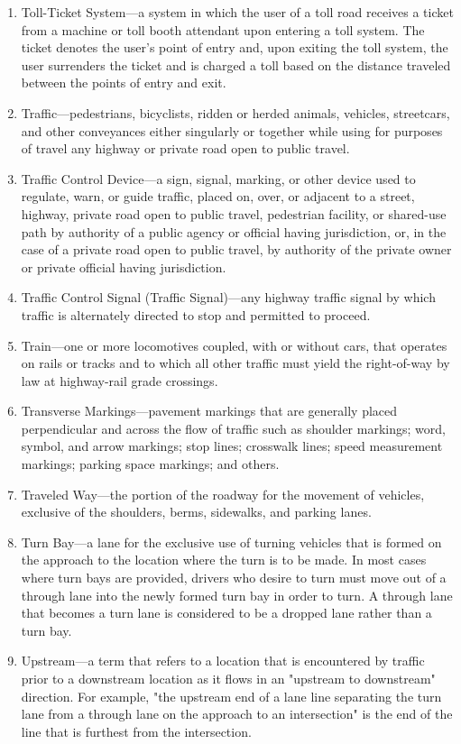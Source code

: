 \documentclass[9pt]{memoir}
\begin{document}
{\begin{enumerate}[label=\arabic*., ref=\arabic*]
\item Toll-Ticket System---a system in which the user of a toll road receives a ticket from a machine or toll booth attendant upon entering a toll system. The ticket denotes the user's point of entry and, upon exiting the toll system, the user surrenders the ticket and is charged a toll based on the distance traveled between the points of entry and exit.
\item Traffic---pedestrians, bicyclists, ridden or herded animals, vehicles, streetcars, and other conveyances either singularly or together while using for purposes of travel any highway or private road open to public travel.
\item Traffic Control Device---a sign, signal, marking, or other device used to regulate, warn, or guide traffic, placed on, over, or adjacent to a street, highway, private road open to public travel, pedestrian facility, or shared-use path by authority of a public agency or official having jurisdiction, or, in the case of a private road open to public travel, by authority of the private owner or private official having jurisdiction.
\item Traffic Control Signal (Traffic Signal)---any highway traffic signal by which traffic is alternately directed to stop and permitted to proceed.
\item Train---one or more locomotives coupled, with or without cars, that operates on rails or tracks and to which all other traffic must yield the right-of-way by law at highway-rail grade crossings.
\item Transverse Markings---pavement markings that are generally placed perpendicular and across the flow of traffic such as shoulder markings; word, symbol, and arrow markings; stop lines; crosswalk lines; speed measurement markings; parking space markings; and others.
\item Traveled Way---the portion of the roadway for the movement of vehicles, exclusive of the shoulders, berms, sidewalks, and parking lanes.
\item Turn Bay---a lane for the exclusive use of turning vehicles that is formed on the approach to the location where the turn is to be made. In most cases where turn bays are provided, drivers who desire to turn must move out of a through lane into the newly formed turn bay in order to turn. A through lane that becomes a turn lane is considered to be a dropped lane rather than a turn bay.
\item Upstream---a term that refers to a location that is encountered by traffic prior to a downstream location as it flows in an "upstream to downstream" direction. For example, "the upstream end of a lane line separating the turn lane from a through lane on the approach to an intersection" is the end of the line that is furthest from the intersection.

\end{enumerate}}
\end{document}
